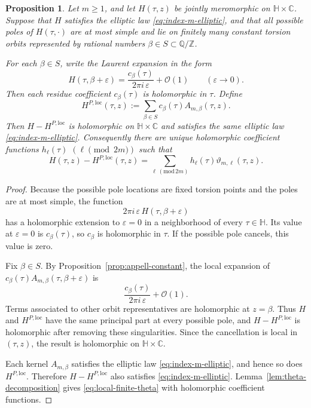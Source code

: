\documentclass[12pt]{amsart}
\numberwithin{equation}{section}
\newtheorem{proposition}[theorem]{Proposition}
\newcommand{\CC}{\mathbb C}
\newcommand{\HH}{\mathbb H}
\newcommand{\QQ}{\mathbb Q}
\newcommand{\ZZ}{\mathbb Z}
\newcommand{\OO}{\mathcal O}
\begin{document}
\begin{proposition}%
\label{prop:local-polar-subtraction}
Let \(m\geq 1\), and let \(H(\tau,z)\) be jointly meromorphic on
\(\HH\times\CC\).  Suppose that \(H\) satisfies the elliptic law
\eqref{eq:index-m-elliptic}, and that all possible poles of \(H(\tau,\cdot)\)
are at most simple and lie on finitely many constant torsion orbits represented
by rational numbers \(\beta\in S\subset\QQ/\ZZ\).

For each \(\beta\in S\), write the Laurent expansion in the form
\[
H(\tau,\beta+\varepsilon)
=
\frac{c_{\beta}(\tau)}{2\pi i\,\varepsilon}+\OO(1)
\qquad (\varepsilon\to 0).
\]
Then each residue coefficient \(c_\beta(\tau)\) is holomorphic in \(\tau\).
Define
\[
H^{P,\mathrm{loc}}(\tau,z)
:=
\sum_{\beta\in S}c_{\beta}(\tau)A_{m,\beta}(\tau,z).
\]
Then \(H-H^{P,\mathrm{loc}}\) is holomorphic on \(\HH\times\CC\) and satisfies
the same elliptic law \eqref{eq:index-m-elliptic}.  Consequently there are
unique holomorphic coefficient functions \(h_\ell(\tau)\) \((\ell\pmod{2m})\)
such that
\begin{equation}\label{eq:local-finite-theta}
H(\tau,z)-H^{P,\mathrm{loc}}(\tau,z)
=
\sum_{\ell\, (\mathrm{mod}\,2m)} h_\ell(\tau)\vartheta_{m,\ell}(\tau,z).
\end{equation}
\end{proposition}

\begin{proof}
Because the possible pole locations are fixed torsion points and the poles are
at most simple, the function
\[
2\pi i\,\varepsilon\,H(\tau,\beta+\varepsilon)
\]
has a holomorphic extension to \(\varepsilon=0\) in a neighborhood of every
\(\tau\in\HH\).  Its value at \(\varepsilon=0\) is \(c_\beta(\tau)\), so
\(c_\beta\) is holomorphic in \(\tau\).  If the possible pole cancels, this
value is zero.

Fix \(\beta\in S\).  By Proposition~\ref{prop:appell-constant}, the local
expansion of \(c_\beta(\tau)A_{m,\beta}(\tau,\beta+\varepsilon)\) is
\[
\frac{c_\beta(\tau)}{2\pi i\,\varepsilon}+\OO(1).
\]
Terms associated to other orbit representatives are holomorphic at
\(z=\beta\).  Thus \(H\) and \(H^{P,\mathrm{loc}}\) have the same principal
part at every possible pole, and \(H-H^{P,\mathrm{loc}}\) is holomorphic after
removing these singularities.  Since the cancellation is local in
\((\tau,z)\), the result is holomorphic on \(\HH\times\CC\).

Each kernel \(A_{m,\beta}\) satisfies the elliptic law \eqref{eq:index-m-elliptic}, and hence so does \(H^{P,\mathrm{loc}}\).  Therefore \(H-H^{P,\mathrm{loc}}\) also satisfies \eqref{eq:index-m-elliptic}.  Lemma~\ref{lem:theta-decomposition} gives \eqref{eq:local-finite-theta} with holomorphic coefficient functions.
\end{proof}
\end{document}
